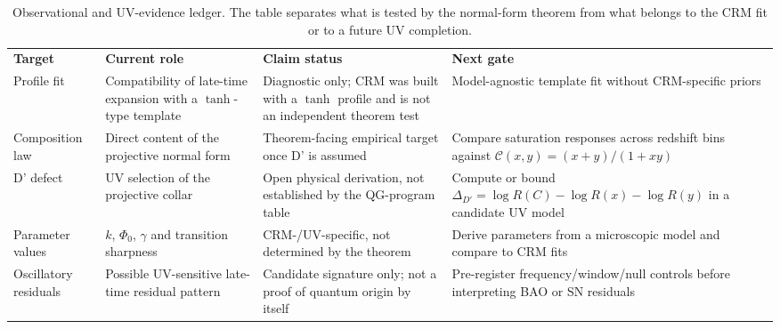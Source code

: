 \documentclass[aps,prd,twocolumn,superscriptaddress,nofootinbib]{revtex4-2}
\begin{document}
\begin{table}[t]
\caption{Observational and UV-evidence ledger. The table separates what is tested by the normal-form theorem from what belongs to the CRM fit or to a future UV completion.}
\label{tab:observational_ledger}
\small
\begin{ruledtabular}
\begin{tabular}{@{}llll@{}}
\parbox[t]{0.14\textwidth}{\textbf{Target}} & \parbox[t]{0.24\textwidth}{\textbf{Current role}} & \parbox[t]{0.25\textwidth}{\textbf{Claim status}} & \parbox[t]{0.28\textwidth}{\textbf{Next gate}} \\
\parbox[t]{0.14\textwidth}{Profile fit} & \parbox[t]{0.24\textwidth}{Compatibility of late-time expansion with a $\tanh$-type template} & \parbox[t]{0.25\textwidth}{Diagnostic only; CRM was built with a $\tanh$ profile and is not an independent theorem test} & \parbox[t]{0.28\textwidth}{Model-agnostic template fit without CRM-specific priors} \\[0.6em]
\parbox[t]{0.14\textwidth}{Composition law} & \parbox[t]{0.24\textwidth}{Direct content of the projective normal form} & \parbox[t]{0.25\textwidth}{Theorem-facing empirical target once D' is assumed} & \parbox[t]{0.28\textwidth}{Compare saturation responses across redshift bins against $\mathcal{C}(x,y)=(x+y)/(1+xy)$} \\[0.6em]
\parbox[t]{0.14\textwidth}{D' defect} & \parbox[t]{0.24\textwidth}{UV selection of the projective collar} & \parbox[t]{0.25\textwidth}{Open physical derivation, not established by the QG-program table} & \parbox[t]{0.28\textwidth}{Compute or bound $\Delta_{D'}=\log R(C)-\log R(x)-\log R(y)$ in a candidate UV model} \\[0.6em]
\parbox[t]{0.14\textwidth}{Parameter values} & \parbox[t]{0.24\textwidth}{$k$, $\Phi_0$, $\gamma$ and transition sharpness} & \parbox[t]{0.25\textwidth}{CRM-/UV-specific, not determined by the theorem} & \parbox[t]{0.28\textwidth}{Derive parameters from a microscopic model and compare to CRM fits} \\[0.6em]
\parbox[t]{0.14\textwidth}{Oscillatory residuals} & \parbox[t]{0.24\textwidth}{Possible UV-sensitive late-time residual pattern} & \parbox[t]{0.25\textwidth}{Candidate signature only; not a proof of quantum origin by itself} & \parbox[t]{0.28\textwidth}{Pre-register frequency/window/null controls before interpreting BAO or SN residuals} \\
\end{tabular}
\end{ruledtabular}
\end{table}
\end{document}
